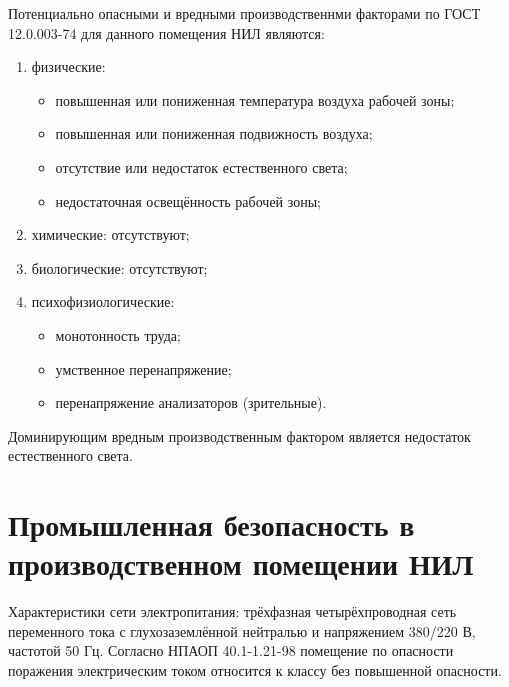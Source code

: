 Потенциально опасными и вредными производственнми факторами по ГОСТ 12.0.003-74
для данного помещения НИЛ являются:

\begin{enumerate}

    \item физические:

    \begin{itemize}

        \item повышенная или пониженная температура воздуха рабочей зоны;
        
        \item повышенная или пониженная подвижность воздуха;
        
        \item отсутствие или недостаток естественного света;
        
        \item недостаточная освещённость рабочей зоны;
        
    \end{itemize}

    \item химические: отсутствуют;
   
    \item биологические: отсутствуют;
    
    \item психофизиологические:

    \begin{itemize}

        \item монотонность труда;

        \item умственное перенапряжение;

        \item перенапряжение анализаторов (зрительные).

    \end{itemize}

\end{enumerate}

Доминирующим вредным производственным фактором является недостаток естественного
света.


\section{Промышленная безопасность в производственном помещении НИЛ}

Характеристики сети электропитания: трёхфазная четырёхпроводная сеть переменного
тока с глухозаземлённой нейтралью и напряжением 380/220 В, частотой 50 Гц.
Согласно НПАОП 40.1-1.21-98 помещение по опасности поражения электрическим током
относится к классу без повышенной опасности.

